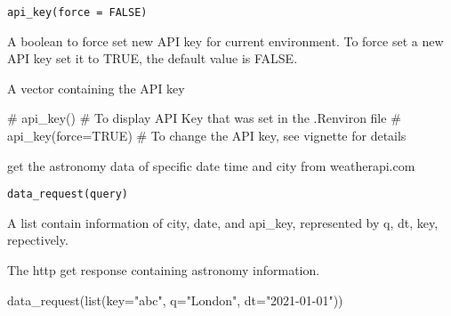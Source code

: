 \documentclass[a4paper]{book}
\begin{document}
%
\begin{Usage}
\begin{verbatim}
api_key(force = FALSE)
\end{verbatim}
\end{Usage}
%
\begin{Arguments}
\begin{ldescription}
\item[\code{force}] A boolean to force set new API key for current environment.
To force set a new API key set it to TRUE, the default value is FALSE.
\end{ldescription}
\end{Arguments}
%
\begin{Value}
A vector containing the API key
\end{Value}
%
\begin{Examples}
\begin{ExampleCode}
# api_key() # To display API Key that was set in the .Renviron file
# api_key(force=TRUE) # To change the API key, see vignette for details
\end{ExampleCode}
\end{Examples}
%
\begin{Description}\relax
get the astronomy data of specific date time and city from weatherapi.com
\end{Description}
%
\begin{Usage}
\begin{verbatim}
data_request(query)
\end{verbatim}
\end{Usage}
%
\begin{Arguments}
\begin{ldescription}
\item[\code{query}] A list contain information of city, date, and api\_key, represented by q, dt, key, repectively.
\end{ldescription}
\end{Arguments}
%
\begin{Value}
The http get response containing astronomy information.
\end{Value}
%
\begin{Examples}
\begin{ExampleCode}
data_request(list(key="abc", q="London", dt="2021-01-01"))
\end{ExampleCode}
\end{Examples}
\end{document}
